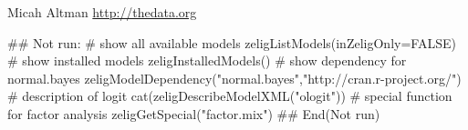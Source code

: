 \begin{Author}\relax
Micah Altman
\url{http://thedata.org}
\end{Author}
\begin{SeeAlso}\relax
{}
\end{SeeAlso}
\begin{Examples}
\begin{ExampleCode}## Not run: 
        # show all available models
        zeligListModels(inZeligOnly=FALSE)
        # show installed models
        zeligInstalledModels()
        # show dependency for normal.bayes
        zeligModelDependency("normal.bayes","http://cran.r-project.org/")
        # description of logit
        cat(zeligDescribeModelXML("ologit"))
        # special function for factor analysis
        zeligGetSpecial("factor.mix")
## End(Not run)


\end{ExampleCode}
\end{Examples}


